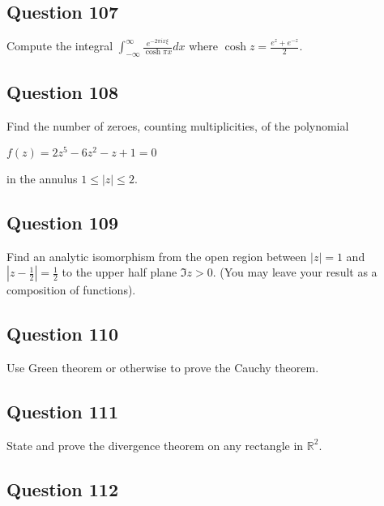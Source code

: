 \documentclass[12pt]{article}
\begin{document}
\hypertarget{question-107-1}{%
\subsection{Question 107}\label{question-107-1}}

Compute the integral
\(\displaystyle{\int_{-\infty}^{\infty} \frac{e^{-2\pi ix\xi}}{\cosh\pi x}dx}\)
where \(\displaystyle{\cosh z=\frac{e^{z}+e^{-z}}{2}}\).

\hypertarget{question-108-1}{%
\subsection{Question 108}\label{question-108-1}}

Find the number of zeroes, counting multiplicities, of the polynomial

\(f(z) = 2z^5 - 6z^2 - z + 1 = 0\)

in the annulus \(1 \leq |z| \leq 2\).

\hypertarget{question-109-1}{%
\subsection{Question 109}\label{question-109-1}}

Find an analytic isomorphism from the open region between \(|z| = 1\)
and \(|z -\frac 1 2| =\frac 1 2\) to the upper half plane \(\Im z > 0\).
(You may leave your result as a composition of functions).

\hypertarget{question-110-1}{%
\subsection{Question 110}\label{question-110-1}}

Use Green theorem or otherwise to prove the Cauchy theorem.

\hypertarget{question-111-1}{%
\subsection{Question 111}\label{question-111-1}}

State and prove the divergence theorem on any rectangle in
\(\mathbb{R}^2\).

\hypertarget{question-112-1}{%
\subsection{Question 112}\label{question-112-1}}
\end{document}
